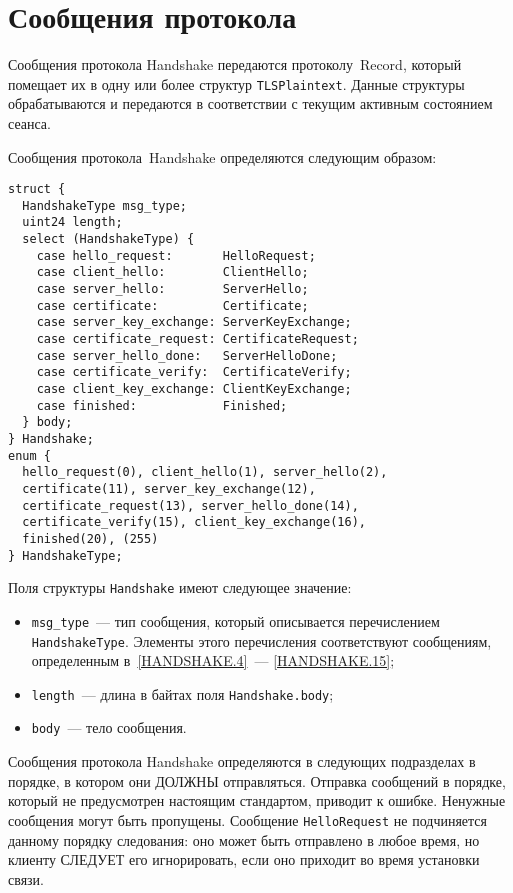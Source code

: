 \section{Сообщения протокола}\label{HANDSHAKE.3}

Сообщения протокола Handshake передаются протоколу~Record, который 
помещает их в одну или более структур \lstinline{TLSPlaintext}. 
Данные структуры обрабатываются и передаются в соответствии с текущим 
активным состоянием сеанса. 

Сообщения протокола~Handshake определяются следующим образом:
\begin{lstlisting}
struct {
  HandshakeType msg_type;
  uint24 length;
  select (HandshakeType) {
    case hello_request:       HelloRequest;
    case client_hello:        ClientHello;
    case server_hello:        ServerHello;
    case certificate:         Certificate;
    case server_key_exchange: ServerKeyExchange;
    case certificate_request: CertificateRequest;
    case server_hello_done:   ServerHelloDone;
    case certificate_verify:  CertificateVerify;
    case client_key_exchange: ClientKeyExchange;
    case finished:            Finished;
  } body;
} Handshake;
enum {
  hello_request(0), client_hello(1), server_hello(2),
  certificate(11), server_key_exchange(12),
  certificate_request(13), server_hello_done(14),
  certificate_verify(15), client_key_exchange(16),
  finished(20), (255)
} HandshakeType;
\end{lstlisting}

Поля структуры \lstinline{Handshake} имеют следующее значение:
\begin{itemize}
\item[--]
\lstinline{msg_type}~--- тип сообщения, который описывается 
перечислением \lstinline{HandshakeType}. Элементы этого перечисления 
соответствуют сообщениям, определенным в~\ref{HANDSHAKE.4}~--- \ref{HANDSHAKE.15}; 

\item[--]
\lstinline{length}~--- длина в байтах поля \lstinline{Handshake.body};

\item[--]
\lstinline{body}~--- тело сообщения.
\end{itemize}

Сообщения протокола Handshake определяются в следующих подразделах в 
порядке, в котором они ДОЛЖНЫ отправляться. Отправка сообщений в порядке, 
который не предусмотрен настоящим стандартом, приводит к ошибке. Ненужные 
сообщения могут быть пропущены. Сообщение \lstinline{HelloRequest} не подчиняется 
данному порядку следования: оно может быть отправлено в любое время, но 
клиенту СЛЕДУЕТ его игнорировать, если оно приходит во время установки 
связи. 

